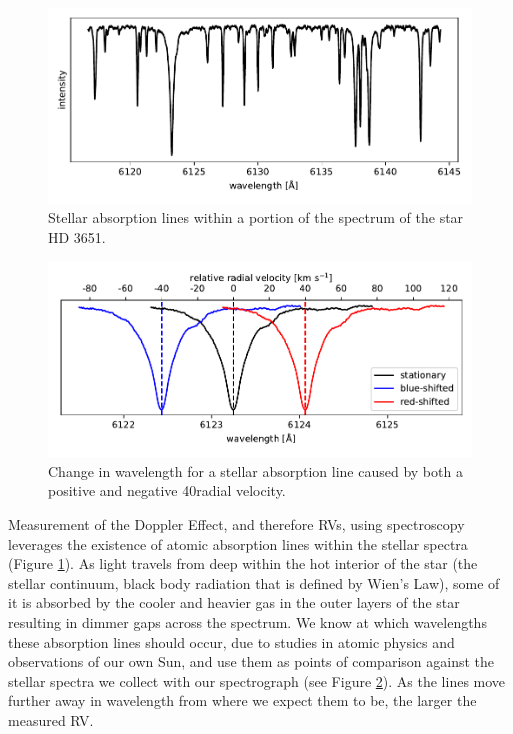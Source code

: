 \begin{figure}
    \centering
    \includegraphics[width=\textwidth]{figures-1/star.pdf}
    \caption[Example of Stellar Absorption Lines -- HD 3651]{Stellar absorption lines within a portion of the spectrum of the star HD 3651.}
    \label{fig:star}
\end{figure}

\begin{figure}
    \centering
    \includegraphics[width=\textwidth]{figures-1/absorption-lines.pdf}
    \caption[Doppler Effect Example -- Change in wavelength of a stellar absorption line]{Change in wavelength for a stellar absorption line caused by both a positive and negative 40\kms radial velocity.}
    \label{fig:absorption-lines}
\end{figure}

Measurement of the Doppler Effect, and therefore RVs, using spectroscopy leverages the existence of atomic absorption lines within the stellar spectra (Figure \ref{fig:star}). As light travels from deep within the hot interior of the star (the stellar continuum, black body radiation that is defined by Wien's Law), some of it is absorbed by the cooler and heavier gas in the outer layers of the star resulting in dimmer gaps across the spectrum. We know at which wavelengths these absorption lines should occur, due to studies in atomic physics and observations of our own Sun, and use them as points of comparison against the stellar spectra we collect with our spectrograph (see Figure \ref{fig:absorption-lines}). As the lines move further away in wavelength from where we expect them to be, the larger the measured RV.

